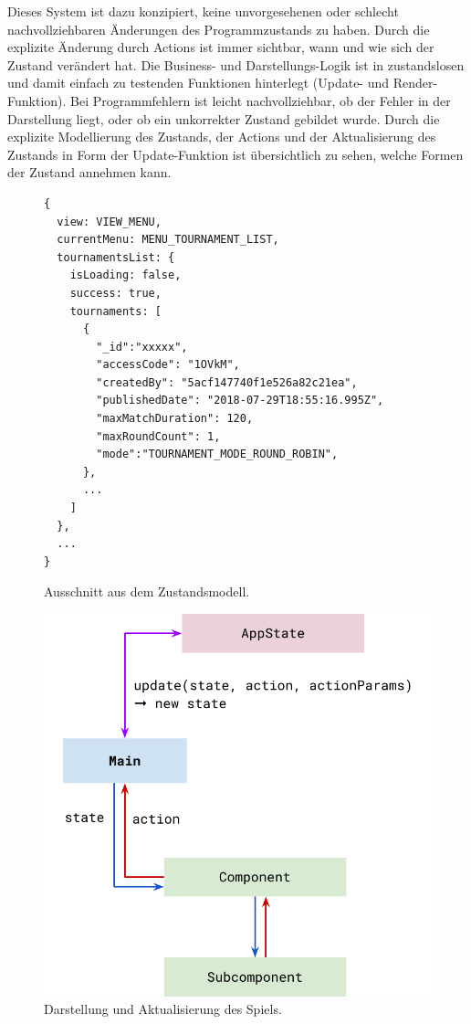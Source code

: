 Dieses System ist dazu konzipiert, keine unvorgesehenen oder schlecht nachvollziehbaren Änderungen
des Programmzustands zu haben. Durch die explizite Änderung durch Actions ist immer sichtbar, wann
und wie sich der Zustand verändert hat. Die Business- und Darstellungs-Logik ist in zustandslosen
und damit einfach zu testenden Funktionen hinterlegt (Update- und Render-Funktion). Bei
Programmfehlern ist leicht nachvollziehbar, ob der Fehler in der Darstellung liegt, oder ob ein
unkorrekter Zustand gebildet wurde. Durch die explizite Modellierung des Zustands, der Actions und
der Aktualisierung des Zustands in Form der Update-Funktion ist übersichtlich zu sehen, welche
Formen der Zustand annehmen kann.


\begin{figure}
  \caption{Ausschnitt aus dem Zustandsmodell.}

  \label{state-model}

  \begin{lstlisting}
{
  view: VIEW_MENU,
  currentMenu: MENU_TOURNAMENT_LIST,
  tournamentsList: {
    isLoading: false,
    success: true,
    tournaments: [
      {
        "_id":"xxxxx",
        "accessCode": "1OVkM",
        "createdBy": "5acf147740f1e526a82c21ea",
        "publishedDate": "2018-07-29T18:55:16.995Z",
        "maxMatchDuration": 120,
        "maxRoundCount": 1,
        "mode":"TOURNAMENT_MODE_ROUND_ROBIN",
      },
      ...
    ]
  },
  ...
}
  \end{lstlisting}
\end{figure}

\begin{figure}
  \caption{Darstellung und Aktualisierung des Spiels.}

  \label{update-loop-diagram}
  
  \includegraphics{figures/statemanagement-flow.pdf}
\end{figure}

